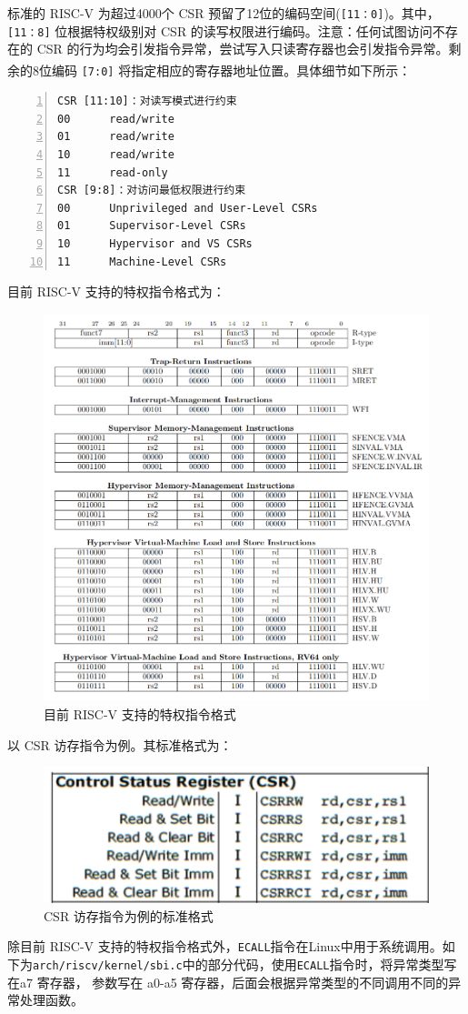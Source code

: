 \documentclass[UTF8,fontset=none,linespread=1.15]{ctexart}
\let\nosupcite\cite
\renewcommand*{\cite}[1]{\textsuperscript{\nosupcite{#1}}}
\begin{document}
标准的 RISC-V 为超过4000个 CSR 预留了12位的编码空间(\texttt{[11：0]})。其中，\texttt{[11：8]} 位根据特权级别对 CSR 的读写权限进行编码。注意：任何试图访问不存在的 CSR 的行为均会引发指令异常，尝试写入只读寄存器也会引发指令异常。剩余的8位编码 \texttt{[7:0]} 将指定相应的寄存器地址位置。具体细节如下所示：\cite{b}\cite{c}

\begin{lstlisting}[numbers=left]
CSR [11:10]：对读写模式进行约束
00		read/write
01		read/write
10		read/write
11		read-only
CSR [9:8]：对访问最低权限进行约束
00		Unprivileged and User-Level CSRs
01		Supervisor-Level CSRs
10		Hypervisor and VS CSRs
11		Machine-Level CSRs
\end{lstlisting}


目前 RISC-V 支持的特权指令格式为：
\begin{figure}[!hbt]
	\centering
	\includegraphics[width=0.7\linewidth]{assets/W2}
	\caption{目前 RISC-V 支持的特权指令格式}
	\label{fig:w2}
\end{figure}
以 CSR 访存指令为例。其标准格式为：
\begin{figure}[!hbt]
	\centering
	\includegraphics[width=0.7\linewidth]{assets/W3}
	\caption{ CSR 访存指令为例的标准格式}
	\label{fig:w3}
\end{figure}
除目前 RISC-V 支持的特权指令格式外，\texttt{ECALL}指令在Linux中用于系统调用。如下为\texttt{arch/riscv/kernel/sbi.c}中的部分代码，使用\texttt{ECALL}指令时，将异常类型写在a7 寄存器， 参数写在 a0-a5 寄存器，后面会根据异常类型的不同调用不同的异常处理函数。
\end{document}
